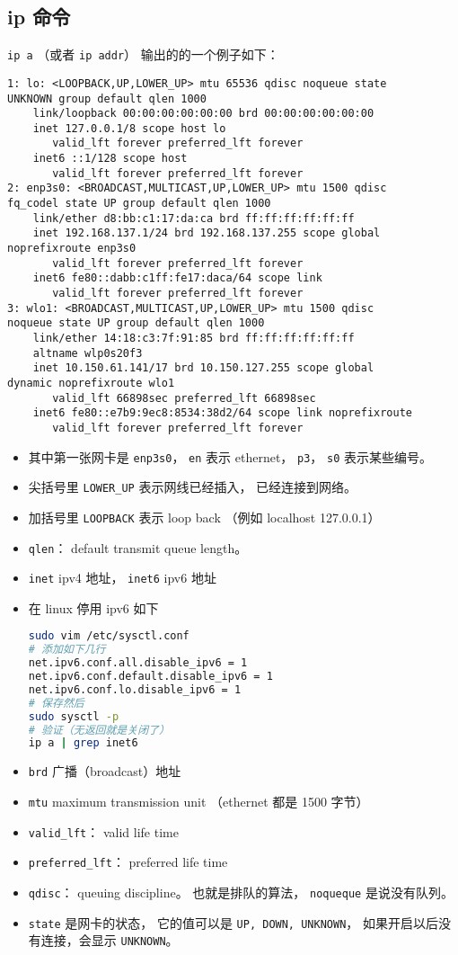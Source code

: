 \subsection{ip 命令}
\verb`ip a` （或者 \verb`ip addr`） 输出的的一个例子如下：
\begin{lstlisting}[language=none]
1: lo: <LOOPBACK,UP,LOWER_UP> mtu 65536 qdisc noqueue state 
UNKNOWN group default qlen 1000
    link/loopback 00:00:00:00:00:00 brd 00:00:00:00:00:00
    inet 127.0.0.1/8 scope host lo
       valid_lft forever preferred_lft forever
    inet6 ::1/128 scope host 
       valid_lft forever preferred_lft forever
2: enp3s0: <BROADCAST,MULTICAST,UP,LOWER_UP> mtu 1500 qdisc
fq_codel state UP group default qlen 1000
    link/ether d8:bb:c1:17:da:ca brd ff:ff:ff:ff:ff:ff
    inet 192.168.137.1/24 brd 192.168.137.255 scope global 
noprefixroute enp3s0
       valid_lft forever preferred_lft forever
    inet6 fe80::dabb:c1ff:fe17:daca/64 scope link 
       valid_lft forever preferred_lft forever
3: wlo1: <BROADCAST,MULTICAST,UP,LOWER_UP> mtu 1500 qdisc
noqueue state UP group default qlen 1000
    link/ether 14:18:c3:7f:91:85 brd ff:ff:ff:ff:ff:ff
    altname wlp0s20f3
    inet 10.150.61.141/17 brd 10.150.127.255 scope global 
dynamic noprefixroute wlo1
       valid_lft 66898sec preferred_lft 66898sec
    inet6 fe80::e7b9:9ec8:8534:38d2/64 scope link noprefixroute 
       valid_lft forever preferred_lft forever
\end{lstlisting}
\begin{itemize}
\item 其中第一张网卡是 \verb`enp3s0`， \verb`en` 表示 ethernet， \verb`p3`， \verb`s0` 表示某些编号。
\item 尖括号里 \verb`LOWER_UP` 表示网线已经插入， 已经连接到网络。
\item 加括号里 \verb`LOOPBACK` 表示 loop back （例如 localhost 127.0.0.1）
\item \verb`qlen`： default transmit queue length。
\item \verb`inet` ipv4 地址， \verb`inet6` ipv6 地址
\item 在 linux 停用 ipv6 如下
\begin{lstlisting}[language=bash]
sudo vim /etc/sysctl.conf
# 添加如下几行
net.ipv6.conf.all.disable_ipv6 = 1
net.ipv6.conf.default.disable_ipv6 = 1
net.ipv6.conf.lo.disable_ipv6 = 1
# 保存然后
sudo sysctl -p
# 验证（无返回就是关闭了）
ip a | grep inet6
\end{lstlisting}
\item \verb`brd` 广播（broadcast）地址
\item \verb`mtu` maximum transmission unit （ethernet 都是 1500 字节）
\item \verb`valid_lft`： valid life time
\item \verb`preferred_lft`： preferred life time
\item \verb`qdisc`： queuing discipline。 也就是排队的算法， \verb`noqueque` 是说没有队列。
\item \verb`state` 是网卡的状态， 它的值可以是 \verb`UP, DOWN, UNKNOWN`， 如果开启以后没有连接，会显示 \verb`UNKNOWN`。
\end{itemize}



